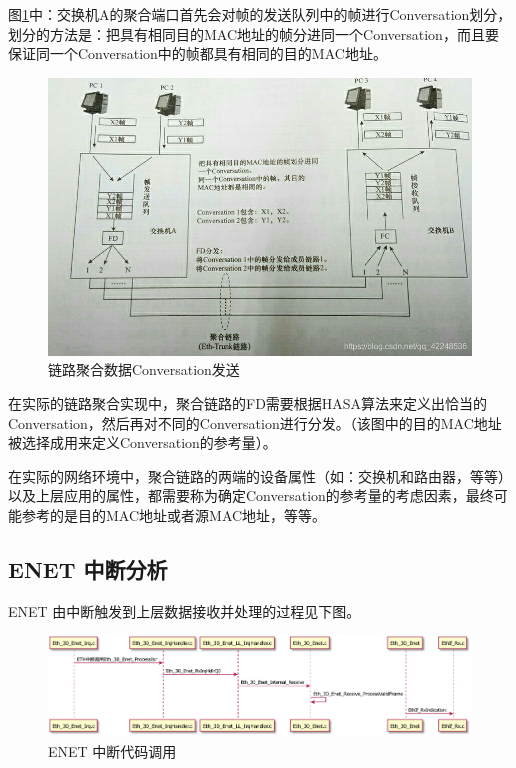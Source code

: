 图\ref{fig:switch_link_aggre_conversation_transmit}中：交换机A的聚合端口首先会对帧的发送队列中的帧进行Conversation划分，
划分的方法是：把具有相同目的MAC地址的帧分进同一个Conversation，而且要保证同一个Conversation中的帧都具有相同的目的MAC地址。
\begin{figure}[ht]
    \centering
    \includegraphics[scale=0.5]{pic/20190414180436629.jpg}
    \caption{链路聚合数据Conversation发送}
    \label{fig:switch_link_aggre_conversation_transmit}
\end{figure}

在实际的链路聚合实现中，聚合链路的FD需要根据HASA算法来定义出恰当的Conversation，然后再对不同的Conversation进行分发。（该图中的目的MAC地址被选择成用来定义Conversation的参考量）。

在实际的网络环境中，聚合链路的两端的设备属性（如：交换机和路由器，等等）以及上层应用的属性，都需要称为确定Conversation的参考量的考虑因素，最终可能参考的是目的MAC地址或者源MAC地址，等等。

\subsection{ENET 中断分析}

ENET 由中断触发到上层数据接收并处理的过程见下图。

\begin{figure}[ht]
    \centering
    \includegraphics[scale=0.5]{pic/eth_isr.pdf}
    \caption{ENET 中断代码调用}
    \label{fig:enet_isr}
\end{figure}

